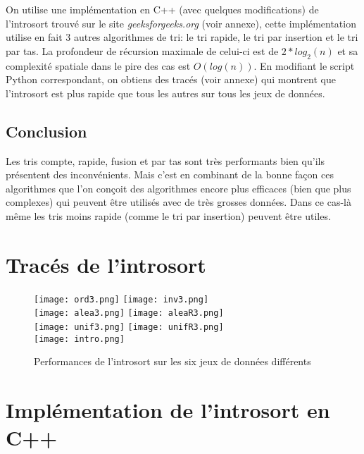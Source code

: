 \documentclass[12pt]{article}
\begin{document}
			On utilise une implémentation en C++ (avec quelques modifications) de l'introsort trouvé sur le site \textit{geeksforgeeks.org} (voir annexe), cette implémentation utilise en fait 3 autres algorithmes de tri: le tri rapide, le tri par insertion et le tri par tas. La profondeur de récursion maximale de celui-ci est de $2*log_2(n)$ et sa complexité spatiale dans le pire des cas est $O(log(n))$. En modifiant le script Python correspondant, on obtiens des tracés (voir annexe) qui montrent que l'introsort est plus rapide que tous les autres sur tous les jeux de données.

		\subsection{Conclusion}
			Les tris compte, rapide, fusion et par tas sont très performants bien qu'ils présentent 
		des inconvénients. Mais c'est en combinant de la bonne façon ces algorithmes que l'on conçoit des algorithmes encore plus efficaces (bien que plus complexes) qui peuvent être utilisés avec de très grosses données. Dans ce cas-là même les tris moins rapide (comme le tri par insertion) peuvent être utiles.
	\begin{appendices}
		\newpage
		\section{Tracés de l'introsort}
		\begin{figure}[hbt!]
			\centering
			\texttt{[image: ord3.png]}
			\texttt{[image: inv3.png]} \\
			\texttt{[image: alea3.png]}
			\texttt{[image: aleaR3.png]} \\
			\texttt{[image: unif3.png]}
			\texttt{[image: unifR3.png]} \\
			\texttt{[image: intro.png]} \\
			\caption{Performances de l'introsort sur les six jeux de données différents}
		\end{figure}
		\justify
		
		\section{Implémentation de l'introsort en C++}
		
	\end{appendices}
\end{document}
